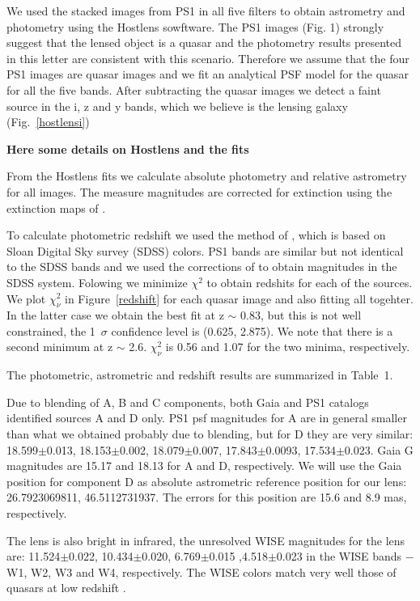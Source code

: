 \documentclass[manuscript]{aastex}
\begin{document}
We used the stacked images from PS1 in all five filters to obtain astrometry and photometry using the Hostlens sowftware.
The PS1 images (Fig. 1) strongly suggest that the lensed object is a quasar and the photometry results presented in this letter are consistent with this scenario. Therefore we assume that the four PS1 images are quasar images and we fit an analytical PSF model for the quasar for all the five bands. After subtracting the quasar images we detect a faint source in the i, z and y bands, which we believe is the lensing galaxy (Fig.~\ref{hostlensi})

{\bf Here some details on Hostlens and the fits}

From the Hostlens fits we calculate absolute photometry and relative astrometry for all images. The measure magnitudes are corrected for extinction using the extinction maps of \citet{sch11}.

To calculate photometric redshift we used the method of \citet{wu10}, which is based on Sloan Digital Sky survey (SDSS) colors. PS1 bands are similar but not identical to the SDSS bands and we used the corrections of \citep{fin16} to obtain magnitudes in the SDSS system. Folowing \citet{wu10} we minimize ${\chi}^2$ to obtain redshits for each of the sources. We plot $\chi^2_{\nu}$ in Figure~\ref{redshift} for each quasar image and also fitting all togehter. In the latter case we obtain the best fit at z $\sim$ 0.83, but this is not well constrained, the 1~$\sigma$ confidence level is (0.625,  2.875). We note that there is a second minimum at z $\sim$ 2.6. $\chi^2_{\nu}$ is 0.56 and 1.07 for the two minima, respectively.

The photometric, astrometric and redshift results are summarized in Table~1. 

Due to blending of A, B and C components, both Gaia \citep{gaia} and PS1 catalogs identified sources A and D only. 
PS1 psf magnitudes for A are in general smaller than what we obtained probably due to blending, but for D they are very similar: 18.599$\pm$0.013,  18.153$\pm$0.002,  18.079$\pm$0.007,  17.843$\pm$0.0093,  17.534$\pm$0.023. Gaia G magnitudes are 15.17 and 18.13 for A and D, respectively.
We will use the Gaia position for component D as absolute astrometric reference position for our lens: 26.7923069811, 46.5112731937. The errors for this position are 15.6 and 8.9 mas, respectively.

The lens is also bright in infrared, the unresolved WISE magnitudes for the lens are: 11.524$\pm$0.022, 10.434$\pm$0.020, 6.769$\pm$0.015 ,4.518$\pm$0.023  in the WISE bands $-$ W1, W2, W3 and W4, respectively. The WISE colors match very well those of quasars at low redshift \citep[e.g.][]{mat12}.
\end{document}
